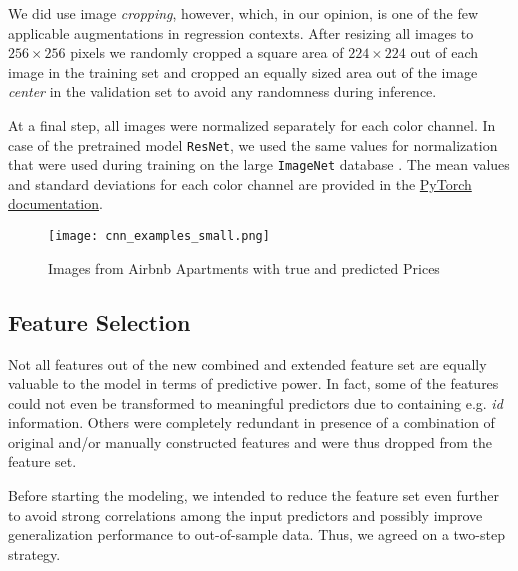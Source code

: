 We did use image \emph{cropping}, however, which, in our opinion, is one of the few applicable augmentations in regression contexts.
After resizing all images to $256 \times 256$ pixels we randomly cropped a square area of $224 \times 224$ out of each image in the training set and cropped an equally sized area out of the image \emph{center} in the validation set to avoid any randomness during inference.

At a final step, all images were normalized separately for each color channel.
In case of the pretrained model \texttt{ResNet}, we used the same values for normalization that were used during training on the large \texttt{ImageNet} database \citep{russakovsky2015}.
The mean values and standard deviations for each color channel are provided in the \href{https://pytorch.org/vision/stable/models.html}{PyTorch documentation}.

\begin{figure}[t]
  \centering
  \texttt{[image: cnn\_examples\_small.png]}
  \caption{Images from Airbnb Apartments with true and predicted Prices}
  \label{fig:cnn-examples}
\end{figure}

\subsection{Feature Selection} \label{appendix:feature-selection}

Not all features out of the new combined and extended feature set are equally valuable to the model in terms of predictive power.
In fact, some of the features could not even be transformed to meaningful predictors due to containing e.g. \emph{id} information.
Others were completely redundant in presence of a combination of original and/or manually constructed features and were thus dropped from the feature set.

Before starting the modeling, we intended to reduce the feature set even further to avoid strong correlations among the input predictors and possibly improve generalization performance to out-of-sample data.
Thus, we agreed on a two-step strategy.

